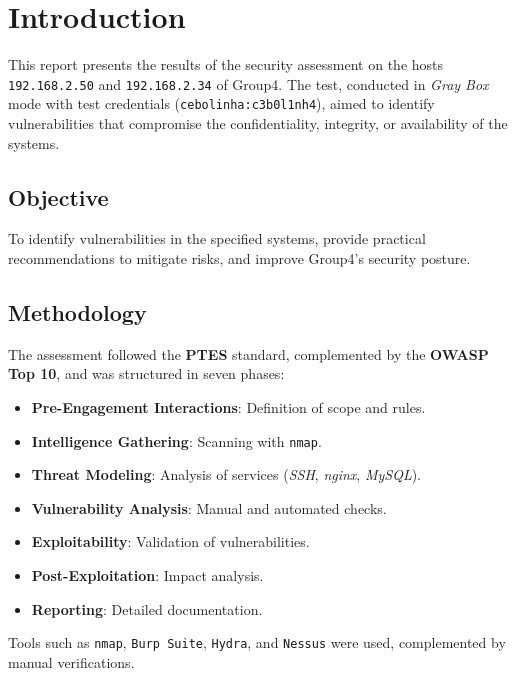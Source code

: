 \documentclass[a4paper,12pt]{article}
\begin{document}
\section{Introduction}
This report presents the results of the security assessment on the hosts \texttt{192.168.2.50} and \texttt{192.168.2.34} of Group4. The test, conducted in \textit{Gray Box} mode with test credentials (\texttt{cebolinha:c3b0l1nh4}), aimed to identify vulnerabilities that compromise the confidentiality, integrity, or availability of the systems.

\subsection{Objective}
To identify vulnerabilities in the specified systems, provide practical recommendations to mitigate risks, and improve Group4's security posture.

\subsection{Methodology}
The assessment followed the \textbf{PTES} standard, complemented by the \textbf{OWASP Top 10}, and was structured in seven phases:
\begin{itemize}
    \item \textbf{Pre-Engagement Interactions}: Definition of scope and rules.
    \item \textbf{Intelligence Gathering}: Scanning with \texttt{nmap}.
    \item \textbf{Threat Modeling}: Analysis of services (\textit{SSH}, \textit{nginx}, \textit{MySQL}).
    \item \textbf{Vulnerability Analysis}: Manual and automated checks.
    \item \textbf{Exploitability}: Validation of vulnerabilities.
    \item \textbf{Post-Exploitation}: Impact analysis.
    \item \textbf{Reporting}: Detailed documentation.
\end{itemize}

Tools such as \texttt{nmap}, \texttt{Burp Suite}, \texttt{Hydra}, and \texttt{Nessus} were used, complemented by manual verifications.

\clearpage
\end{document}
